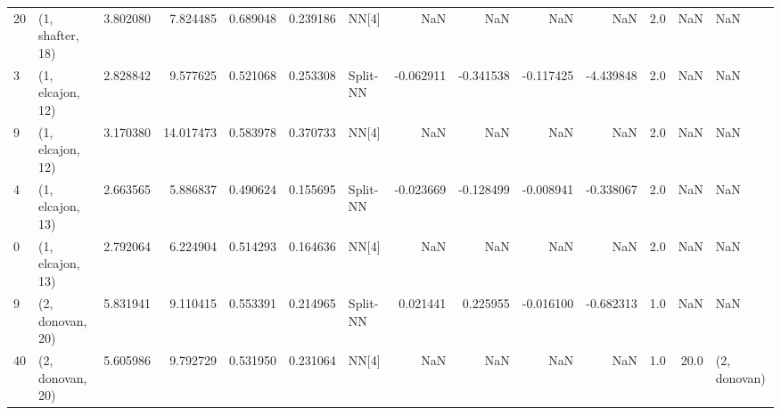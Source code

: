 \begin{tabular}{llrrrrlrrrrrrl}
20 &  (1, shafter, 18) &   3.802080 &   7.824485 &   0.689048 &  0.239186 &       NN[4] &             NaN &           NaN &            NaN &          NaN &            2.0 &    NaN &              NaN \\
3  &  (1, elcajon, 12) &   2.828842 &   9.577625 &   0.521068 &  0.253308 &    Split-NN &       -0.062911 &     -0.341538 &      -0.117425 &    -4.439848 &            2.0 &    NaN &              NaN \\
9  &  (1, elcajon, 12) &   3.170380 &  14.017473 &   0.583978 &  0.370733 &       NN[4] &             NaN &           NaN &            NaN &          NaN &            2.0 &    NaN &              NaN \\
4  &  (1, elcajon, 13) &   2.663565 &   5.886837 &   0.490624 &  0.155695 &    Split-NN &       -0.023669 &     -0.128499 &      -0.008941 &    -0.338067 &            2.0 &    NaN &              NaN \\
0  &  (1, elcajon, 13) &   2.792064 &   6.224904 &   0.514293 &  0.164636 &       NN[4] &             NaN &           NaN &            NaN &          NaN &            2.0 &    NaN &              NaN \\
9  &  (2, donovan, 20) &   5.831941 &   9.110415 &   0.553391 &  0.214965 &    Split-NN &        0.021441 &      0.225955 &      -0.016100 &    -0.682313 &            1.0 &    NaN &              NaN \\
40 &  (2, donovan, 20) &   5.605986 &   9.792729 &   0.531950 &  0.231064 &       NN[4] &             NaN &           NaN &            NaN &          NaN &            1.0 &   20.0 &     (2, donovan) \\
\bottomrule
\end{tabular}
